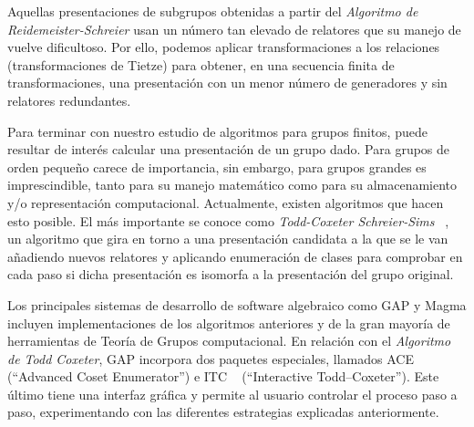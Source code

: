Aquellas presentaciones de subgrupos obtenidas a partir  del \textit{Algoritmo de Reidemeister-Schreier} usan un número tan elevado de relatores que su manejo de vuelve dificultoso. Por ello, podemos aplicar transformaciones a los relaciones (transformaciones de Tietze) para obtener, en una secuencia finita de transformaciones, una presentación con un menor número de generadores y sin relatores redundantes.




Para terminar con nuestro estudio de algoritmos para grupos finitos, puede resultar de interés calcular una presentación de un grupo dado. Para grupos de orden pequeño carece de importancia, sin embargo, para grupos grandes es imprescindible, tanto para su manejo matemático como para su almacenamiento y/o representación  computacional. Actualmente, existen algoritmos que hacen esto posible. El más importante se conoce como \textit{Todd-Coxeter Schreier-Sims} ~\cite{TCSS}, un algoritmo que gira en torno a una presentación candidata a la que se le van añadiendo nuevos relatores y aplicando enumeración de clases para  comprobar en cada paso si dicha presentación  es isomorfa a la presentación del grupo original.



Los principales sistemas de desarrollo de software algebraico como GAP y Magma incluyen implementaciones de los algoritmos anteriores y de la gran mayoría de herramientas de Teoría de Grupos computacional. En relación con el \textit{Algoritmo de Todd Coxeter}, GAP incorpora dos paquetes especiales, llamados ACE ~\cite{ace} (“Advanced Coset Enumerator”) e ITC ~\cite{itc}  (“Interactive Todd–Coxeter”). Este último tiene una interfaz gráfica  y permite al usuario controlar el proceso paso a paso, experimentando con las diferentes estrategias explicadas anteriormente. 










